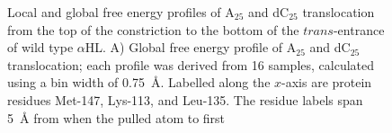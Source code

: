 \documentclass[a4paper,10pt]{article}
\newcommand{\dctf}{dC$_{25}$ }
\newcommand{\atf}{A$_{25}$ }
\newcommand{\ahl}{$\alpha$HL }
\newcommand{\ahlnsp}{$\alpha$HL}
\newcommand{\up}{\vspace*{-1em}}
\begin{document}
 \begin{figure}[!h]
  \begin{center}
    \end{center}
\up\up\up
   \caption[Local and global free energy profiles of \atf and \dctf translocation from the top of the constriction to the bottom of the $trans$-entrance of wild type \ahl]{\small Local and global free energy profiles of \atf and \dctf translocation from the top of the constriction to the bottom of the $trans$-entrance of wild type \ahlnsp. A) Global free energy profile of \atf and \dctf
translocation; each profile was derived from 16 samples, calculated using a bin width of 0.75~{\AA}. Labelled along the $x$-axis are protein residues Met-147, Lys-113, and Leu-135. The residue labels span 5~{\AA} from when the pulled atom to first
}
\end{figure}
\end{document}
